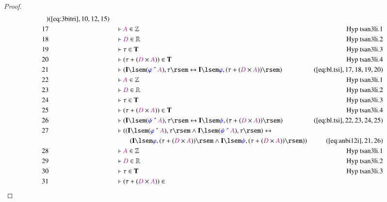 \begin{proof}
\begin{align}
      )&(\mbox{\ref{eq:3bitri}},10,12,15)\notag
  \\ 17 &&  & \vdash \mc{A} \in
      \mathbb{Z}&\text{Hyp~tsan3li.1}\notag%
  \\ 18 &&  & \vdash \mc{D} \in
      \mathbb{R}&\text{Hyp~tsan3li.2}\notag%
  \\ 19 &&  & \vdash \tau \in
      \mathbf{T}&\text{Hyp~tsan3li.3}\notag%
  \\ 20 &&  & \vdash ( \tau + ( \mc{D} \times \mc{A} ) ) \in
      \mathbf{T}&\text{Hyp~tsan3li.4}\notag%
  \\ 21 &&  & \vdash ( \mathbf{I} \lsem ( \mw{\varphi} ~\string^~ \mc{A} ) ,
      \tau \rsem \leftrightarrow \mathbf{I} \lsem
      \mw{\varphi} , ( \tau + ( \mc{D} \times \mc{A} ) )
      \rsem )&(\mbox{\ref{eq:bl.tsi}},17,18,19,20)\notag
  \\ 22 &&  & \vdash \mc{A} \in
      \mathbb{Z}&\text{Hyp~tsan3li.1}\notag%
  \\ 23 &&  & \vdash \mc{D} \in
      \mathbb{R}&\text{Hyp~tsan3li.2}\notag%
  \\ 24 &&  & \vdash \tau \in
      \mathbf{T}&\text{Hyp~tsan3li.3}\notag%
  \\ 25 &&  & \vdash ( \tau + ( \mc{D} \times \mc{A} ) ) \in
      \mathbf{T}&\text{Hyp~tsan3li.4}\notag%
  \\ 26 &&  & \vdash ( \mathbf{I} \lsem ( \mw{\psi} ~\string^~ \mc{A} ) , \tau
      \rsem \leftrightarrow \mathbf{I} \lsem \mw{\psi} , (
      \tau + ( \mc{D} \times \mc{A} ) ) \rsem
      )&(\mbox{\ref{eq:bl.tsi}},22,23,24,25)\notag
  \\ 27 &&  & \vdash ( ( \mathbf{I} \lsem ( \mw{\varphi} ~\string^~ \mc{A} ) ,
      \tau \rsem \wedge \mathbf{I} \lsem ( \mw{\psi}
      ~\string^~ \mc{A} ) , \tau \rsem ) \leftrightarrow  \notag \\ & & & \qquad
     (
      \mathbf{I} \lsem \mw{\varphi} , ( \tau + ( \mc{D}
      \times \mc{A} ) ) \rsem \wedge \mathbf{I} \lsem
      \mw{\psi} , ( \tau + ( \mc{D} \times \mc{A} ) ) \rsem
      ) )&(\mbox{\ref{eq:anbi12i}},21,26)\notag
  \\ 28 &&  & \vdash \mc{A} \in
      \mathbb{Z}&\text{Hyp~tsan3li.1}\notag%
  \\ 29 &&  & \vdash \mc{D} \in
      \mathbb{R}&\text{Hyp~tsan3li.2}\notag%
  \\ 30 &&  & \vdash \tau \in
      \mathbf{T}&\text{Hyp~tsan3li.3}\notag%
  \\ 31 &&  & \vdash ( \tau + ( \mc{D} \times \mc{A} ) ) \in

\end{align}
\end{proof}
